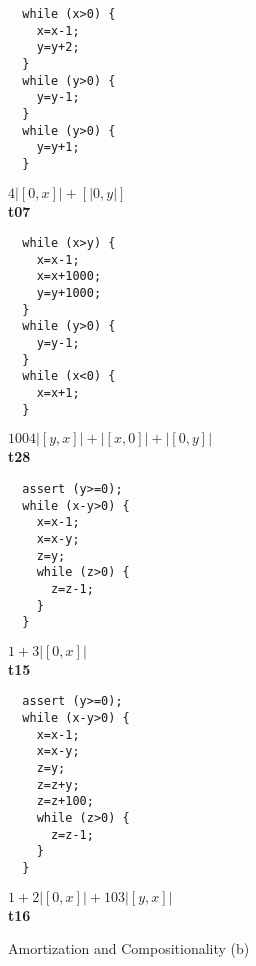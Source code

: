 \documentclass[nocopyrightspace,preprint]{sigplanconf}
\begin{document}
\begin{figure*}[t!]
 \setlength{\progwidth}{.24\linewidth}
  \centering

  \begin{minipage}[b]{\progwidth}
    \begin{center}
   \begin{lstlisting}
  while (x>0) {
    x=x-1;
    y=y+2;
  }
  while (y>0) {
    y=y-1;
  }
  while (y>0) {
    y=y+1;
  }
   \end{lstlisting}

$4|[0,x]| + [|0,y|]$
\\[.7\baselineskip]
      {\bf t07}
    \end{center}
  \end{minipage}%
%
%
%
  \begin{minipage}[b]{\progwidth}
    \begin{center}
   \begin{lstlisting}
  while (x>y) {
    x=x-1;
    x=x+1000;
    y=y+1000;
  }
  while (y>0) {
    y=y-1;
  }
  while (x<0) {
    x=x+1;
  }
   \end{lstlisting}

$1004|[y,x]|+|[x,0]|+|[0,y]|$
\\[.7\baselineskip]
      {\bf t28}
    \end{center}
  \end{minipage}%
%
%
  \begin{minipage}[b]{\progwidth}
    \begin{center}
   \begin{lstlisting}
  assert (y>=0);
  while (x-y>0) {
    x=x-1;
    x=x-y;
    z=y;
    while (z>0) {
      z=z-1;
    }
  }
   \end{lstlisting}

$1+3|[0,x]|$
\\[.7\baselineskip]
      {\bf t15}
    \end{center}
  \end{minipage}
%
%
  \begin{minipage}[b]{\progwidth}
    \begin{center}
   \begin{lstlisting}
  assert (y>=0);
  while (x-y>0) {
    x=x-1;
    x=x-y;
    z=y;
    z=z+y;
    z=z+100;
    while (z>0) {
      z=z-1;
    }
  }
   \end{lstlisting}

$1+2|[0,x]|+103|[y,x]|$
\\[.7\baselineskip]
      {\bf t16}
    \end{center}
  \end{minipage}


   \caption{Amortization and Compositionality (b)}
  \label{fig:cat1b}
\end{figure*}
\end{document}
